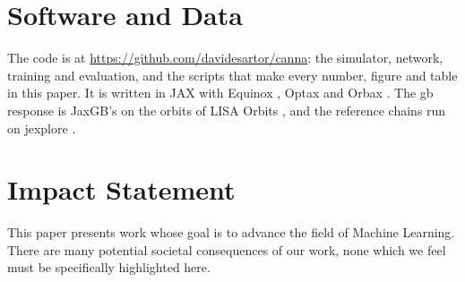 \documentclass{article}
\theoremstyle{plain}
\begin{document}
\section*{Software and Data}
The code is at \url{https://github.com/davidesartor/canna}: the simulator, network, training
and evaluation, and the scripts that make every number, figure and table in this paper.
It is written in JAX \citep{bradbury2018jax} with Equinox \citep{kidger2021equinox}, Optax
\citep{deepmind2020jax} and Orbax \citep{gaffney2026orbax}. The \ac{gb} response is JaxGB's
\citep{jaxgb} on the orbits of LISA Orbits \citep{lisaorbits,martens2021trajectory}, and the
reference chains run on jexplore \citep{jexplore}.

\section*{Impact Statement}

This paper presents work whose goal is to advance the field of Machine Learning. There
are many potential societal consequences of our work, none which we feel must be
specifically highlighted here.




\newpage
\appendix
\renewcommand{\theequation}{\thesection\arabic{equation}}
\onecolumn













\end{document}
